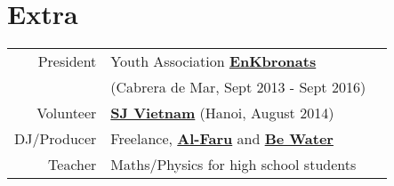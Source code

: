 \documentclass[]{deedy-resume}
\begin{document}
\begin{minipage}[t]{0.43\textwidth}

\section{Extra}

\begin{tabular}{rll}
President & Youth Association \textbf{\href{www.enkbronats.cat}{EnKbronats}} \\
& (Cabrera de Mar, Sept 2013 - Sept 2016) \\
Volunteer  & \textbf{\href{http://www.sjvietnam.org/}{SJ Vietnam}} (Hanoi, August 2014)\\
DJ/Producer & Freelance, \textbf{\href{http://www.alfaru.es/}{Al-Faru}} and \textbf{\href{http://www.bewater.cat/}{Be Water}}\\
Teacher & Maths/Physics for high school students
\end{tabular}
\sectionsep


\end{minipage}
\end{document}
